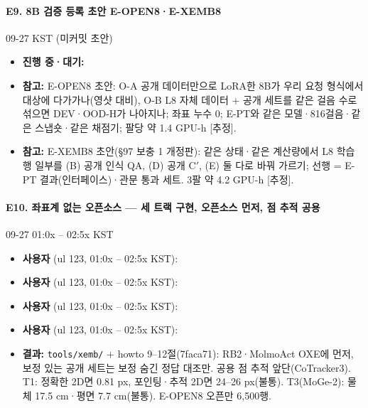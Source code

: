 \paragraph{E9. 8B 검증 등록 초안 E-OPEN8·E-XEMB8}
{\small 09-27 KST (미커밋 초안)}
\begin{itemize}
  \item \textbf{진행 중·대기:} 
  \item \textbf{참고:} E-OPEN8 초안: O-A 공개 데이터만으로 LoRA한 8B가 우리 요청 형식에서 대상에 다가가나(영샷 대비), O-B L8 자체 데이터 + 공개 세트를 같은 걸음 수로 섞으면 DEV·OOD-H가 나아지나; 좌표 누수 0; E-PT와 같은 모델·816걸음·같은 스냅숏·같은 채점기; 팔당 약 1.4 GPU-h [추정].
  \item \textbf{참고:} E-XEMB8 초안(§97 보충 1 개정판): 같은 상태·같은 계산량에서 L8 학습 행 일부를 (B) 공개 인식 QA, (D) 공개 C$'$, (E) 둘 다로 바꿔 가르기; 선행 = E-PT 결과(인터페이스)·관문 통과 세트. 3팔 약 4.2 GPU-h [추정].
\end{itemize}

\paragraph{E10. 좌표계 없는 오픈소스 --- 세 트랙 구현, 오픈소스 먼저, 점 추적 공용}
{\small 09-27 01:0x -- 02:5x KST}
\begin{itemize}
  \item \textbf{사용자} (ul 123, 01:0x -- 02:5x KST): 
  \item \textbf{사용자} (ul 123, 01:0x -- 02:5x KST): 
  \item \textbf{사용자} (ul 123, 01:0x -- 02:5x KST): 
  \item \textbf{사용자} (ul 123, 01:0x -- 02:5x KST): 
  \item \textbf{결과:} \texttt{tools/\allowbreak{}xemb/\allowbreak{}} + howto 9--12절(7faca71): RB2·MolmoAct OXE에 먼저, 보정 있는 공개 세트는 보정 숨긴 정답 대조만. 공용 점 추적 앞단(CoTracker3). T1: 정확한 2D면 0.81 px, 포인팅·추적 2D면 24--26 px(불통). T3(MoGe-2): 물체 17.5 cm·평면 7.7 cm(불통). E-OPEN8 오픈만 6,500행.
\end{itemize}

